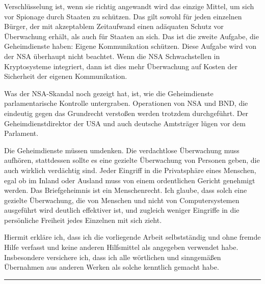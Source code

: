 \documentclass[12pt,a4paper]{scrartcl}
\begin{document}
Verschlüsselung ist, wenn sie richtig angewandt wird das einzige Mittel, um sich vor Spionage durch Staaten zu schützen. Das gilt sowohl für jeden einzelnen Bürger, der mit akzeptablem Zeitaufwand einen adäquaten Schutz vor Überwachung erhält, als auch für Staaten an sich. Das ist die zweite Aufgabe, die Geheimdienste haben: Eigene Kommunikation schützen. Diese Aufgabe wird von der NSA überhaupt nicht beachtet. Wenn die NSA Schwachstellen in Kryptosysteme integriert, dann ist dies mehr Überwachung auf Kosten der Sicherheit der eigenen Kommunikation.

Was der NSA-Skandal noch gezeigt hat, ist, wie die Geheimdienste parlamentarische Kontrolle untergraben. Operationen von NSA und BND, die eindeutig gegen das Grundrecht verstoßen werden trotzdem durchgeführt. Der Geheimdienstdirektor der USA und auch deutsche Amtsträger lügen vor dem Parlament.

Die Geheimdienste müssen umdenken. Die verdachtlose Überwachung muss aufhören, stattdessen sollte es eine gezielte Überwachung von Personen geben, die auch wirklich verdächtig sind. Jeder Eingriff in die Privatsphäre eines Menschen, egal ob im Inland oder Ausland muss von einem ordentlichen Gericht genehmigt werden. Das Briefgeheimnis ist ein Menschenrecht. Ich glaube, dass solch eine gezielte Überwachung, die von Menschen und nicht von Computersystemen ausgeführt wird deutlich effektiver ist, und zugleich weniger Eingriffe in die persönliche Freiheit jedes Einzelnen mit sich zieht.

\newpage
\printbibliography
\vspace{2cm}
Hiermit erkläre ich, dass ich die vorliegende Arbeit selbstständig und ohne fremde Hilfe verfasst und keine anderen Hilfsmittel als angegeben verwendet habe. Insbesondere versichere ich, dass ich alle wörtlichen und sinngemäßen Übernahmen aus anderen Werken als solche kenntlich gemacht habe.
\vspace{2cm}
\hrule
\end{document}
